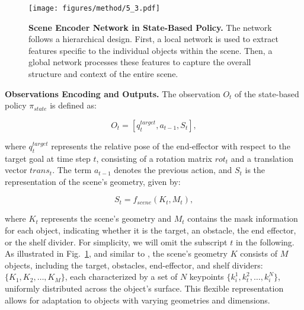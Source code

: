 

\begin{figure}[tb]
    \centering
    \texttt{[image: figures/method/5\_3.pdf]}
    \caption{\textbf{Scene Encoder Network in State-Based Policy.} The network follows a hierarchical design. First, a local network is used to extract features specific to the individual objects within the scene. Then, a global network processes these features to capture the overall structure and context of the entire scene.}
    \label{fig:3}
\end{figure}
\textbf{Observations Encoding and Outputs.} The observation \( O_t \) of the state-based policy \( \pi_{{state}} \) is defined as:

\[
O_t = [ q_t^{{target}}, a_{t-1}, S_t ],
\]

where \( q_t^{{target}} \) represents the relative pose of the end-effector with respect to the target goal at time step \( t \), consisting of a rotation matrix \( {rot}_t \) and a translation vector \( {trans}_t \). The term \( a_{t-1} \) denotes the previous action, and \( S_t \) is the representation of the scene's geometry, given by:

\[
S_t = f_{{scene}}(K_t, M_t),
\]

where \( K_t \) represents the scene's geometry and \( M_t \) contains the mask information for each object, indicating whether it is the target, an obstacle, the end effector, or the shelf divider. For simplicity, we will omit the subscript  $t$  in the following. As illustrated in Fig.~\ref{fig:3}, and similar to \cite{chen2023predicting}, the scene's geometry \( K \) consists of \( M \) objects, including the target, obstacles, end-effector, and shelf dividers: \( \{ K_{1}, K_{2}, \dots, K_{M} \} \), each characterized by a set of \( N \) keypoints \( \{ k_{i}^1, k_{t}^2, \dots, k_{i}^N \} \), uniformly distributed across the object's surface. This flexible representation allows for adaptation to objects with varying geometries and dimensions.


